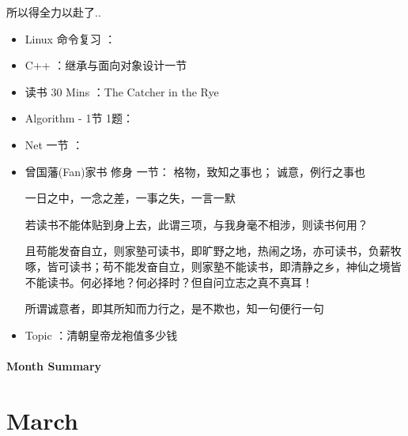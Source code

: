 \documentclass[UTF8,a4paper,8pt]{ctexart}
\begin{document}
	 	 所以得全力以赴了.. 	 
	 	 \begin{itemize}
	 	 	\item  \makebox[0pt][l]{$\square$}\raisebox{.15ex}{\hspace{0.1em}$\checkmark$} Linux 命令复习 ：
	 	 	\item  \makebox[0pt][l]{$\square$}\hspace{1em} C++ ：继承与面向对象设计一节
	 	 	
	 	 	\item  \makebox[0pt][l]{$\square$}\raisebox{.15ex}{\hspace{0.1em}$\checkmark$} 读书  30 Mins	：The Catcher in the Rye	 	 
	 	 	\item  \makebox[0pt][l]{$\square$}\hspace{1em} Algorithm - 1节 1题：
	 	 	\item  \makebox[0pt][l]{$\square$}\hspace{1em} Net 一节 ：
	 	 	
	 	 	\item  \makebox[0pt][l]{$\square$}\raisebox{.15ex}{\hspace{0.1em}$\checkmark$} 曾国藩(Fan)家书 修身 一节：
		 	 	格物，致知之事也； 诚意，例行之事也
		 	 	
		 	 	一日之中，一念之差，一事之失，一言一默
		 	 	
		 	 	若读书不能体贴到身上去，此谓三项，与我身毫不相涉，则读书何用？
		 	 	
		 	 	且苟能发奋自立，则家塾可读书，即旷野之地，热闹之场，亦可读书，负薪牧啄，皆可读书；苟不能发奋自立，则家塾不能读书，即清静之乡，神仙之境皆不能读书。何必择地？何必择时？但自问立志之真不真耳！
		 	 	
		 	 	所谓诚意者，即其所知而力行之，是不欺也，知一句便行一句
	 	 	\item  \makebox[0pt][l]{$\square$}\raisebox{.15ex}{\hspace{0.1em}$\checkmark$} Topic ：清朝皇帝龙袍值多少钱
	 	 \end{itemize}
	 	 
 	\paragraph{Month Summary}
 	 
 \section{March}
\end{document}
